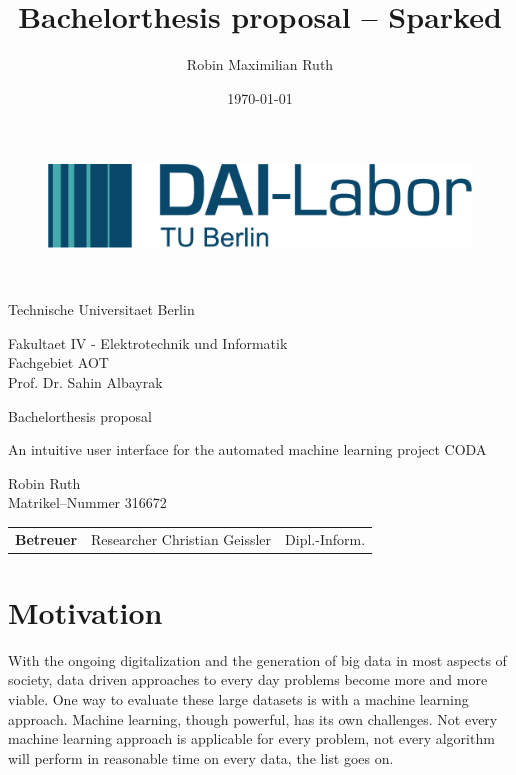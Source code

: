 \documentclass[12pt,a4paper,titlepage,oneside,BCOR1cm]{scrreprt}
\date{\today}
\author{Robin Maximilian Ruth}
\title{Bachelorthesis proposal -- Sparked}
\begin{document}
\thispagestyle{empty}

\begin{figure}[htbp]
\centering
 \begin{minipage}[b]{41 mm}
   \includegraphics[width=40 mm]{./figures/DAI_Logo.png}
 \end{minipage}
\end{figure}

~\vspace{0.5cm}

\begin{center}
\begin{Huge}
Technische Universitaet Berlin\\
\vspace{1mm}
\end{Huge}{\Large Fakultaet IV - Elektrotechnik und Informatik\\
Fachgebiet AOT\\
Prof. Dr. Sahin Albayrak}\\

\vspace{26mm}
\begin{LARGE}
Bachelorthesis proposal\\
\end{LARGE}
\vspace{8mm}
\begin{LARGE}
An intuitive user interface for the automated machine learning project CODA\\
\end{LARGE}
\vspace{3 cm}
Robin Ruth\\
Matrikel--Nummer 316672\\
\vspace{1cm}
\begin{tabular}{lll}
    \textbf{Betreuer} & Researcher Christian Geissler & Dipl.-Inform.\\
\end{tabular}


\end{center}

\tableofcontents
\thispagestyle{empty}


\chapter{Motivation}
With the ongoing digitalization and the generation of big data in most aspects of society, data driven approaches to every day problems become more and more viable. One way to evaluate these large datasets is with a machine learning approach. Machine learning, though powerful, has its own challenges. Not every machine learning approach is applicable for every problem, not every algorithm will perform in reasonable time on every data, the list goes on.
\end{document}
